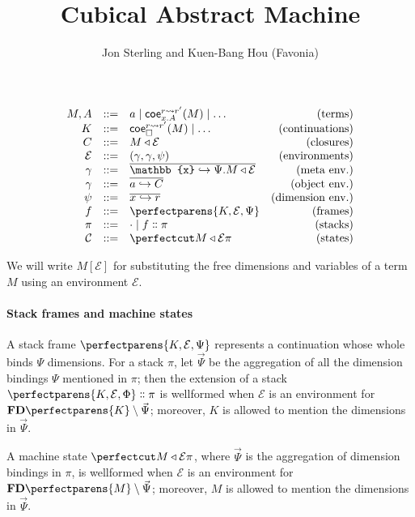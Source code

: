 \documentclass{article}
\title{Cubical Abstract Machine}
\author{Jon Sterling and Kuen-Bang Hou (Favonia)}
\newcommand\Clo[2]{#1\triangleleft{#2}}
\newcommand\Coe[4]{\mathsf{coe}^{#1\leadsto{#2}}_{#3} (#4)}
\newcommand\Cons[2]{{#1}\dblcolon{#2}}
\newcommand\FreeDims[1]{\mathbf{FD}\perfectparens{#1}}
\newcommand\Frame[3]{\perfectparens{#1,#2,#3}}
\newcommand\Cfg[3]{\cut{\Clo{#1}{#2}}{#3}}
\newcommand\Meta[1]{\mathbb{#1}}
\begin{document}
\maketitle

\[
  \begin{array}{rrlr}
    M,A &::= &a\mid \Coe{r}{r'}{x.A}{M}\mid\ldots&\text{(terms)}\\
    K &::= &\Coe{r}{r'}{\Box}{M}\mid\ldots&\text{(continuations)}\\
    C &::= &\Clo{M}{\mathcal{E}}&\text{(closures)}\\
    \mathcal{E} &::= &(\Meta{\gamma},\gamma,\psi)&\text{(environments)}\\
    \Meta{\gamma} &::= &\overline{\Meta{x}\hookrightarrow\Psi.\Clo{M}{\mathcal{E}}}&\text{(meta env.)}\\
    \gamma &::= &\overline{a\hookrightarrow C}&\text{(object env.)}\\
    \psi &::= &\overline{x\hookrightarrow r}&\text{(dimension env.)}\\
    f &::= &\Frame{K}{\mathcal{E}}{\Psi} &\text{(frames)}\\
    \pi &::= &\cdot \mid \Cons{f}{\pi} &\text{(stacks)}\\
    \mathcal{C} &::= &\Cfg{M}{\mathcal{E}}{\pi} &\text{(states)}
  \end{array}
\]

We will write $M[\mathcal{E}]$ for substituting the free dimensions
and variables of a term $M$ using an environment $\mathcal{E}$.

\paragraph{Stack frames and machine states}

A stack frame $\Frame{K}{\mathcal{E}}{\Psi}$ represents a continuation
whose whole binds $\Psi$ dimensions. For a stack $\pi$, let
$\vec{\Psi}$ be the aggregation of all the dimension bindings $\Psi$
mentioned in $\pi$; then the extension of a stack
$\Cons{\Frame{K}{\mathcal{E}}{\Phi}}{\pi}$ is wellformed when
$\mathcal{E}$ is an environment for $\FreeDims{K}\setminus\vec{\Psi}$;
moreover, $K$ is allowed to mention the dimensions in $\vec{\Psi}$.

A machine state $\Cfg{M}{\mathcal{E}}{\pi}$, where $\vec{\Psi}$ is the
aggregation of dimension bindings in $\pi$, is wellformed when
$\mathcal{E}$ is an environment for $\FreeDims{M}\setminus\vec{\Psi}$;
moreover, $M$ is allowed to mention the dimensions in $\vec{\Psi}$.
\end{document}
